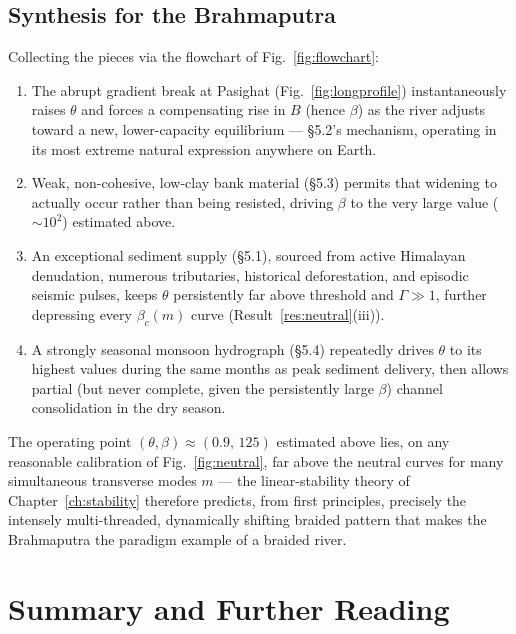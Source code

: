 \documentclass[11pt,a4paper]{report}
\theoremstyle{definition}
\theoremstyle{plain}
\theoremstyle{remark}
\begin{document}
\section{Synthesis for the Brahmaputra}
Collecting the pieces via the flowchart of Fig.~\ref{fig:flowchart}:
\begin{enumerate}[nosep]
\item The abrupt gradient break at Pasighat (Fig.~\ref{fig:longprofile}) instantaneously raises $\theta$ and forces a compensating rise in $B$ (hence $\beta$) as the river adjusts toward a new, lower-capacity equilibrium — \S5.2's mechanism, operating in its most extreme natural expression anywhere on Earth.
\item Weak, non-cohesive, low-clay bank material (\S5.3) permits that widening to actually occur rather than being resisted, driving $\beta$ to the very large value ($\sim10^2$) estimated above.
\item An exceptional sediment supply (\S5.1), sourced from active Himalayan denudation, numerous tributaries, historical deforestation, and episodic seismic pulses, keeps $\theta$ persistently far above threshold and $\Gamma\gg1$, further depressing every $\beta_c(m)$ curve (Result~\ref{res:neutral}(iii)).
\item A strongly seasonal monsoon hydrograph (\S5.4) repeatedly drives $\theta$ to its highest values during the same months as peak sediment delivery, then allows partial (but never complete, given the persistently large $\beta$) channel consolidation in the dry season.
\end{enumerate}
The operating point $(\theta,\beta)\approx(0.9,\,125)$ estimated above lies, on any reasonable calibration of Fig.~\ref{fig:neutral}, far above the neutral curves for many simultaneous transverse modes $m$ — the linear-stability theory of Chapter~\ref{ch:stability} therefore predicts, from first principles, precisely the intensely multi-threaded, dynamically shifting braided pattern that makes the Brahmaputra the paradigm example of a braided river.

\chapter{Summary and Further Reading}
\end{document}
